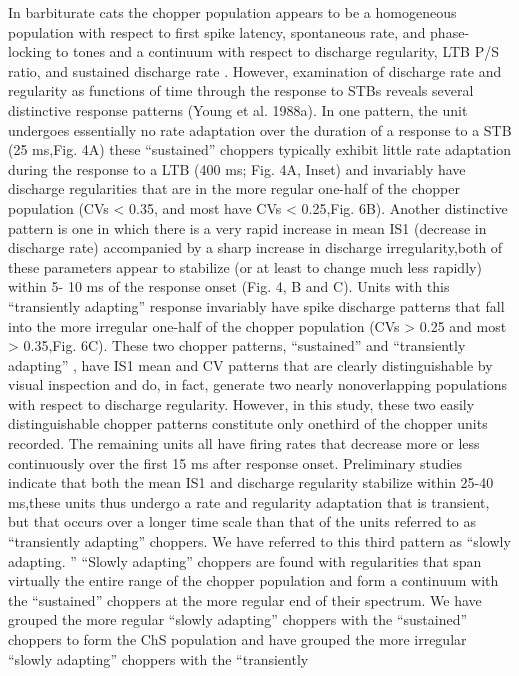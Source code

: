\documentclass[10pt,a4paper]{article}
\begin{document}
In barbiturate cats \citep{BlackburnSachs:1989} the chopper population
appears to be a homogeneous population with respect to first spike latency,
spontaneous rate, and phase-locking to
tones and a continuum with respect to discharge regularity, LTB P/S ratio, and
sustained discharge rate \citep{Bourk:1976,RhodeSmith:1986}. However,
examination of discharge rate and regularity as functions of time through the
response to STBs reveals several distinctive response patterns (Young et
al. 1988a). In one pattern, the unit undergoes essentially no rate adaptation
over the duration of a response to a STB (25 ms,Fig. 4A) these
{\textquotedblleft}sustained{\textquotedblright} choppers typically exhibit
little rate adaptation during the response to a LTB (400 ms; Fig. 4A, Inset) and
invariably have discharge regularities that are in the more regular one-half of
the chopper population (CVs {\textless} 0.35, and most have CVs {\textless}
0.25,Fig. 6B). Another distinctive pattern is one in which there is a very rapid
increase in mean IS1 (decrease in discharge rate) accompanied by a sharp
increase in discharge irregularity,both of these parameters appear to stabilize
(or at least to change much less rapidly) within 5- 10 ms of the response onset
(Fig. 4, B and C). Units with this {\textquotedblleft}transiently
adapting{\textquotedblright} response invariably
have spike discharge patterns that fall into the more irregular one-half of the
chopper population (CVs {\textgreater} 0.25 and most {\textgreater}
0.35,Fig. 6C). These two chopper patterns,
{\textquotedblleft}sustained{\textquotedblright} and
{\textquotedblleft}transiently adapting{\textquotedblright}
\citep{Bourk:1976,YoungRobertEtAl:1988, YoungShofnerEtAl:1988,
  BlackburnSachs:1989}, have IS1 mean and CV patterns that are clearly
distinguishable by visual inspection and do, in fact, generate two nearly
nonoverlapping populations with respect to discharge regularity. However, in
this study, these two easily distinguishable chopper patterns constitute only
onethird of the chopper units recorded. The remaining units all have firing
rates that decrease more or less continuously over the first 15 ms after
response onset.  Preliminary studies indicate that both the mean IS1 and
discharge regularity stabilize within 25-40 ms,these units thus undergo a rate
and regularity adaptation that is transient, but that occurs over a longer time
scale than that of the units referred to as {\textquotedblleft}transiently
adapting{\textquotedblright} choppers.  We have referred to this third pattern
as {\textquotedblleft}slowly adapting. {\textquotedblright}
{\textquotedblleft}Slowly adapting{\textquotedblright} choppers are found with
regularities that span virtually the entire range of the chopper population and
form a continuum with the {\textquotedblleft}sustained{\textquotedblright}
choppers at the more regular end of their spectrum. We have grouped the more
regular {\textquotedblleft}slowly adapting{\textquotedblright} choppers with the
{\textquotedblleft}sustained{\textquotedblright} choppers to form the ChS
population and have grouped the more irregular {\textquotedblleft}slowly
adapting{\textquotedblright} choppers with the {\textquotedblleft}transiently
\end{document}
